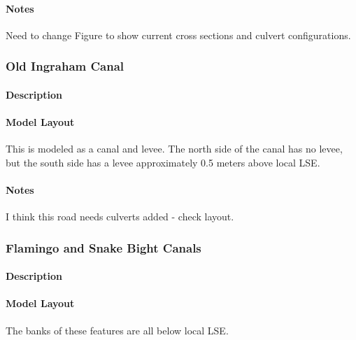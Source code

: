 \begin{notes}
\paragraph{Notes}
Need to change Figure to show current cross sections and culvert configurations.
\end{notes}


\clearpage
\subsubsection{Old Ingraham Canal}
\paragraph{Description}

\paragraph{Model Layout}
This is modeled as a canal and levee. The north side of the canal has no levee, but the south side has a levee approximately 0.5 meters above local LSE.

\begin{notes}
\paragraph{Notes}
I think this road needs culverts added - check layout.
\end{notes}

\clearpage
\subsubsection{Flamingo and Snake Bight Canals}
\paragraph{Description}

\paragraph{Model Layout}
The banks of these features are all below local LSE.

